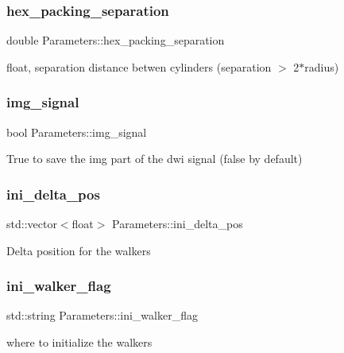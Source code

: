 \subsubsection{\texorpdfstring{hex\+\_\+packing\+\_\+separation}{hex\_packing\_separation}}
{\footnotesize\ttfamily double Parameters\+::hex\+\_\+packing\+\_\+separation}

float, separation distance betwen cylinders (separation $>$ 2$\ast$radius) \mbox{\label{class_parameters_a1dd221193dd0ad7e34a6b4f7c496d899}} 
\subsubsection{\texorpdfstring{img\+\_\+signal}{img\_signal}}
{\footnotesize\ttfamily bool Parameters\+::img\+\_\+signal}

True to save the img part of the dwi signal (false by default) \mbox{\label{class_parameters_aea1568fbc8a92bd90303ea8afc9e8c63}} 
\subsubsection{\texorpdfstring{ini\+\_\+delta\+\_\+pos}{ini\_delta\_pos}}
{\footnotesize\ttfamily std\+::vector$<$float$>$ Parameters\+::ini\+\_\+delta\+\_\+pos}

Delta position for the walkers \mbox{\label{class_parameters_a87cb2db5b45bf9cb36e74903fecfaa6e}} 
\subsubsection{\texorpdfstring{ini\+\_\+walker\+\_\+flag}{ini\_walker\_flag}}
{\footnotesize\ttfamily std\+::string Parameters\+::ini\+\_\+walker\+\_\+flag}

where to initialize the walkers \mbox{\label{class_parameters_a84db69d29321fccb7cc7ea724a74df50}} 
